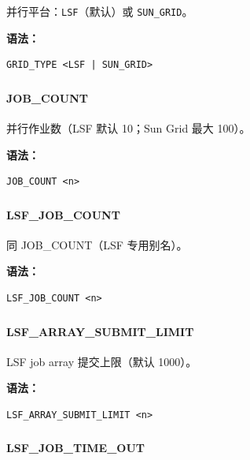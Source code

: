 并行平台：\texttt{LSF}（默认）或 \texttt{SUN\_GRID}。

\textbf{语法：}
\begin{lstlisting}
GRID_TYPE <LSF | SUN_GRID>
\end{lstlisting}

\subsubsection{}
\paragraph*{JOB_COUNT}

并行作业数（LSF 默认 10；Sun Grid 最大 100）。

\textbf{语法：}
\begin{lstlisting}
JOB_COUNT <n>
\end{lstlisting}

\subsubsection{}
\paragraph*{LSF_JOB_COUNT}

同 JOB\_COUNT（LSF 专用别名）。

\textbf{语法：}
\begin{lstlisting}
LSF_JOB_COUNT <n>
\end{lstlisting}

\subsubsection{}
\paragraph*{LSF_ARRAY_SUBMIT_LIMIT}

LSF job array 提交上限（默认 1000）。

\textbf{语法：}
\begin{lstlisting}
LSF_ARRAY_SUBMIT_LIMIT <n>
\end{lstlisting}

\subsubsection{}
\paragraph*{LSF_JOB_TIME_OUT}

